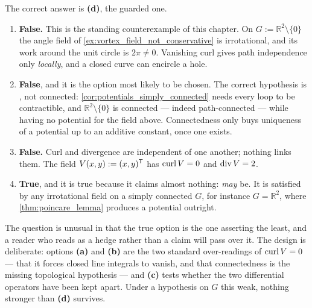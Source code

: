 \begin{exercisesolution}
\label{sol:kobel_irrotational_single_choice}
The correct answer is \textbf{(d)}, the guarded one.
\begin{enumerate}[label=\textbf{(\alph*)}]
  \item \textbf{False.} This is the standing counterexample of this chapter. On
    $G := \mathbb{R}^2\setminus\{0\}$ the angle field of
    \cref{ex:vortex_field_not_conservative} is irrotational, and its work around the unit circle
    is $2\pi \neq 0$. Vanishing curl gives path independence only \emph{locally}, and a closed
    curve can encircle a hole.
  \item \textbf{False}, and it is the option most likely to be chosen. The correct hypothesis is
    , not connected: \cref{cor:potentials_simply_connected} needs every
    loop to be contractible, and $\mathbb{R}^2\setminus\{0\}$ is connected --- indeed
    path-connected --- while having no potential for the field above. Connectedness only buys
    uniqueness of a potential up to an additive constant, once one exists.
  \item \textbf{False.} Curl and divergence are independent of one another; nothing links them. The
    field $V(x,y) := (x,y)^{\mathsf{T}}$ has $\operatorname{curl} V = 0$ and $\operatorname{div} V = 2$.
  \item \textbf{True}, and it is true because it claims almost nothing: \emph{may} be. It is
    satisfied by any irrotational field on a simply connected $G$, for instance $G =
    \mathbb{R}^2$, where \cref{thm:poincare_lemma} produces a potential outright.
\end{enumerate}
\begin{remark}
\label{rem:irrotational_weakest_true_statement}
The question is unusual in that the true option is the one asserting the least, and a reader who
reads  as a hedge rather than a claim will pass over it. The design is
deliberate: options \textbf{(a)} and \textbf{(b)} are the two standard over-readings of
$\operatorname{curl} V = 0$ --- that it forces closed line integrals to vanish, and that connectedness is the
missing topological hypothesis --- and \textbf{(c)} tests whether the two differential operators
have been kept apart. Under a hypothesis on $G$ this weak, nothing stronger than \textbf{(d)}
survives.
\end{remark}
\end{exercisesolution}

